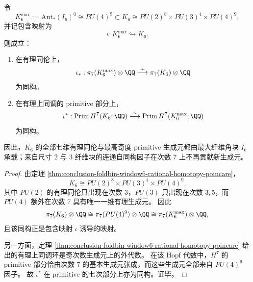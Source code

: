 \begin{theorem}\label{thm:conclusion-foldbin-window6-maxfiber-degree7-dominance}
令
\[
K_6^{\max}:=\mathrm{Aut}_{\ast}(I_6)^0\cong PU(4)^9
\subset
K_6\cong PU(2)^8\times PU(3)^4\times PU(4)^9,
\]
并记包含映射为
\[
\iota:K_6^{\max}\hookrightarrow K_6.
\]
则成立：
\begin{enumerate}
  \item 在有理同伦上，
  \[
  \iota_{\ast}:\pi_7(K_6^{\max})\otimes\QQ
  \overset{\sim}{\longrightarrow}
  \pi_7(K_6)\otimes\QQ
  \]
  为同构。
  \item 在有理上同调的 primitive 部分上，
  \[
  \iota^{\ast}:\operatorname{Prim}H^7(K_6;\QQ)
  \overset{\sim}{\longrightarrow}
  \operatorname{Prim}H^7(K_6^{\max};\QQ)
  \]
  为同构。
\end{enumerate}
因此，\(K_6\) 的全部七维有理同伦与最高奇度 primitive 生成元都由最大纤维角块 \(I_6\) 承载；来自尺寸 \(2\) 与 \(3\) 纤维块的连通自同构因子在次数 \(7\) 上不再贡献新生成元。
\end{theorem}
\begin{proof}
由定理 \ref{thm:conclusion-foldbin-window6-rational-homotopy-poincare}，
\[
K_6\cong PU(2)^8\times PU(3)^4\times PU(4)^9.
\]
其中 \(PU(2)\) 的有理同伦只出现在次数 \(3\)，\(PU(3)\) 只出现在次数 \(3,5\)，而 \(PU(4)\) 额外在次数 \(7\) 具有唯一一维有理生成元。
因此
\[
\pi_7(K_6)\otimes\QQ
\cong
\pi_7(PU(4)^9)\otimes\QQ
\cong
\pi_7(K_6^{\max})\otimes\QQ,
\]
且该同构正是包含映射 \(\iota\) 诱导的映射。

另一方面，定理 \ref{thm:conclusion-foldbin-window6-rational-homotopy-poincare} 给出的有理上同调环是奇次数生成元上的外代数。
在该 Hopf 代数中，\(H^7\) 的 primitive 部分恰由次数 \(7\) 的基本生成元张成，而这些生成元全部来自 \(PU(4)^9\) 因子。
故 \(\iota^\ast\) 在 primitive 的七次部分上亦为同构。证毕。
\end{proof}



\endinput
